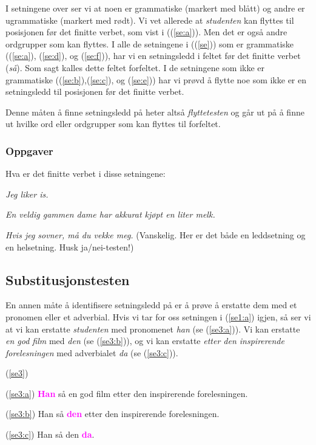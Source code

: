 \documentclass{article}
\let\footnote=\endnote
\begin{document}
I setningene over ser vi at noen er grammatiske (markert med bl{\aa}tt) og andre er ugrammatiske (markert med r{\o}dt). Vi vet allerede at {\it studenten} kan flyttes til posisjonen f{\o}r det finitte verbet, som vist i ((\ref{se:a})). Men det er ogs{\aa} andre ordgrupper som kan flyttes. I alle de setningene i ((\ref{se})) som er grammatiske ((\ref{se:a}), (\ref{se:d}), og (\ref{se:f})), har vi en setningsledd i feltet f{\o}r det finitte verbet ({\it s{\aa}}). Som sagt kalles dette feltet forfeltet. I de setningene som ikke er grammatiske ((\ref{se:b}),(\ref{se:c}), og (\ref{se:e})) har vi pr{\o}vd {\aa} flytte noe som ikke er en setningsledd til posisjonen f{\o}r det finitte verbet.

Denne m{\aa}ten {\aa} finne setningsledd p{\aa} heter alts{\aa} {\it flyttetesten} og g{\aa}r ut p{\aa} {\aa} finne ut hvilke ord eller ordgrupper som kan flyttes til forfeltet.

\subsubsection{Oppgaver}

Hva er det finitte verbet i disse setningene: 

{\it Jeg liker is.}\footnote{{\it liker}}

{\it En veldig gammen dame har akkurat kj{\o}pt en liter melk.}\footnote{\it har}

{\it Hvis jeg sovner, m{\aa} du vekke meg.}\footnote{\it m{\aa}} (Vanskelig. Her er det b{\aa}de en leddsetning og en helsetning. Husk ja/nei-testen!) 

\subsection{Substitusjonstesten}

En annen m{\aa}te {\aa} identifisere setningsledd p{\aa} er {\aa} pr{\o}ve {\aa} erstatte dem med et pronomen eller et adverbial.
Hvis vi tar for oss setningen i (\ref{se1:a}) igjen, s{\aa} ser vi at vi kan erstatte {\it studenten} med pronomenet {\it han} (se (\ref{se3:a})). Vi kan erstatte {\it en god film} med {\it den} (se (\ref{se3:b})), og vi kan erstatte {\it etter den inspirerende forelesningen} med adverbialet {\it da} (se (\ref{se3:c})).

\begin{exe}
\ex\label{se3} (\ref{se3})
\begin{xlist}
\ex\label{se3:a} (\ref{se3:a}) \textcolor{magenta}{\bf Han} s{\aa} en god film etter den inspirerende forelesningen.

\ex\label{se3:b} (\ref{se3:b}) Han s{\aa} \textcolor{magenta}{\bf den} etter den inspirerende forelesningen.

\ex\label{se3:c} (\ref{se3:c}) Han s{\aa} den \textcolor{magenta}{\bf da}.
\end{xlist}
\end{exe}
\end{document}
